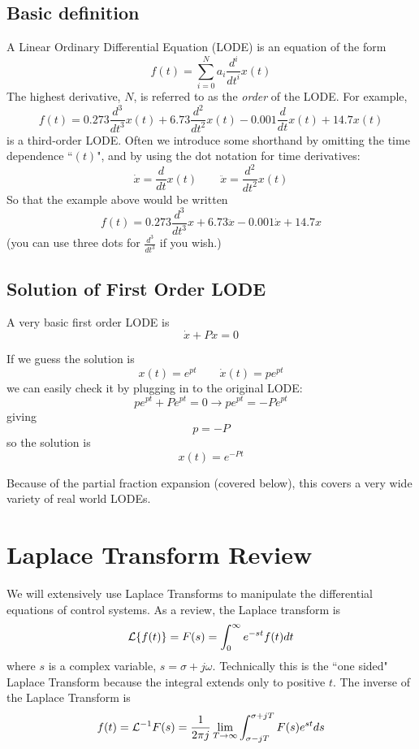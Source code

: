 \subsection{Basic definition}

A Linear Ordinary Differential Equation (LODE) is an equation of the form
\[
f(t) = \sum_{i=0}^{N} a_i\frac{d^i}{dt^i}x(t)
\]
The highest derivative, $N$, is referred to as the {\it order} of the LODE.  For example,
\[
f(t) = 0.273\frac{d^3}{dt^3}x(t) + 6.73\frac{d^2}{dt^2}x(t) - 0.001\frac{d}{dt}x(t) + 14.7x(t)
\]
is a third-order LODE.   Often we introduce some shorthand by omitting the time dependence ``$(t)$", and by using the dot notation for time derivatives:
\[
\dot{x} = \frac{d}{dt}x(t)  \qquad \ddot{x} = \frac{d^2}{dt^2}x(t)
\]
So that the example above would be written
\[
f(t) =0.273\frac{d^3}{dt^3}x + 6.73\ddot{x} - 0.001\dot{x} + 14.7x
\]
(you can use three dots for $\frac{d^3}{dt^3}$ if you wish.)



\subsection{Solution of First Order LODE}

A very basic  first order LODE is
\[
\dot{x} + Px = 0
\]

If we guess the solution is
\[
x(t) = e^{pt} \qquad \dot{x}(t) = pe^{pt}
\]
we can easily check it by plugging in to the original LODE:
\[
pe^{pt} +Pe^{pt} = 0 \to pe^{pt} = -Pe^{pt}
\]
giving
\[
p = -P
\]
so the solution is
\[
x(t) = e^{-Pt}
\]

Because of the partial fraction expansion (covered below), this covers a very wide variety of real world LODEs.


\section{Laplace Transform Review}

We will extensively use Laplace Transforms to manipulate the differential equations of control systems.  As a review, the Laplace transform is
\[
\mathcal{L} \{f(t)\} = F(s) =  \int_{0}^{\infty} e^{-st}f(t)dt
\]
where $s$ is a complex variable, $s=\sigma + j \omega$.  Technically this is the ``one sided" Laplace Transform because the integral extends only to positive $t$.
The inverse of the Laplace Transform is
\[
f(t) = \mathcal{L}^{-1}F(s) = \frac{1}{2\pi j} \lim_{T\to\infty} \int_{\sigma - j T}^{\sigma + jT}F(s) e^{st}ds
\]

